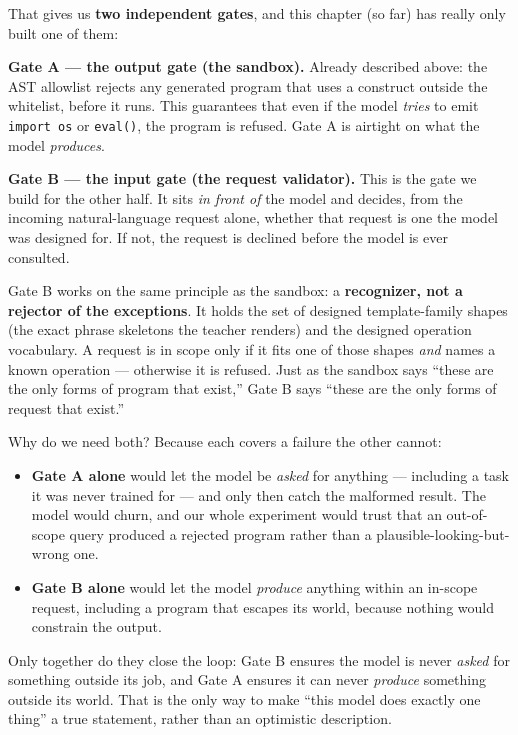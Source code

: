 That gives us \textbf{two independent gates}, and this chapter (so far)
has really only built one of them:

\textbf{Gate A --- the output gate (the sandbox).} Already described
above: the AST allowlist rejects any generated program that uses a
construct outside the whitelist, before it runs. This guarantees that
even if the model \emph{tries} to emit \texttt{import\ os} or
\texttt{eval()}, the program is refused. Gate A is airtight on what the
model \emph{produces}.

\textbf{Gate B --- the input gate (the request validator).} This is the
gate we build for the other half. It sits \emph{in front of} the model
and decides, from the incoming natural-language request alone, whether
that request is one the model was designed for. If not, the request is
declined before the model is ever consulted.

Gate B works on the same principle as the sandbox: a \textbf{recognizer,
not a rejector of the exceptions}. It holds the set of designed
template-family shapes (the exact phrase skeletons the teacher renders)
and the designed operation vocabulary. A request is in scope only if it
fits one of those shapes \emph{and} names a known operation ---
otherwise it is refused. Just as the sandbox says ``these are the only
forms of program that exist,'' Gate B says ``these are the only forms of
request that exist.''

Why do we need both? Because each covers a failure the other cannot:

\begin{itemize}
\tightlist
\item
  \textbf{Gate A alone} would let the model be \emph{asked} for anything
  --- including a task it was never trained for --- and only then catch
  the malformed result. The model would churn, and our whole experiment
  would trust that an out-of-scope query produced a rejected program
  rather than a plausible-looking-but-wrong one.
\item
  \textbf{Gate B alone} would let the model \emph{produce} anything
  within an in-scope request, including a program that escapes its
  world, because nothing would constrain the output.
\end{itemize}

Only together do they close the loop: Gate B ensures the model is never
\emph{asked} for something outside its job, and Gate A ensures it can
never \emph{produce} something outside its world. That is the only way
to make ``this model does exactly one thing'' a true statement, rather
than an optimistic description.

